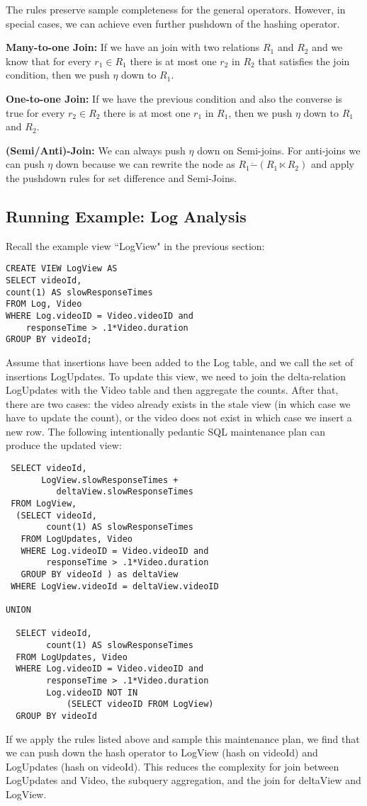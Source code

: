 The rules preserve sample completeness for the general operators. 
However, in special cases, we can achieve even further pushdown of the hashing operator. 

\textbf{Many-to-one Join: } If we have an join with two relations $R_1$ and $R_2$ and we know that for every $r_1 \in R_1$ there is at most one $r_2$ in $R_2$ that satisfies the join condition, then we push $\eta$ down to $R_1$.

\textbf{One-to-one Join: } If we have the previous condition and also the converse is true for every $r_2 \in R_2$ there is at most one $r_1$ in $R_1$, then we push $\eta$ down to $R_1$ and $R_2$.

\textbf{(Semi/Anti)-Join: } We can always push $\eta$ down on Semi-joins. For anti-joins we can push $\eta$ down because we can rewrite the node as $R_1 \dot{-} (R_1 \ltimes R_2) $ and apply the pushdown rules for set difference and Semi-Joins.

\subsection{Running Example: Log Analysis}
Recall the example view ``LogView" in the previous section:
\begin{lstlisting} 
CREATE VIEW LogView AS 
SELECT videoId, 
count(1) AS slowResponseTimes 
FROM Log, Video
WHERE Log.videoID = Video.videoID and
    responseTime > .1*Video.duration
GROUP BY videoId;
\end{lstlisting}

Assume that insertions have been added to the Log table, and we call the set of insertions LogUpdates.
To update this view, we need to join the delta-relation LogUpdates with the Video table and then aggregate the counts.
After that, there are two cases: the video already exists in the stale view (in which case we have to update the count), or
the video does not exist in which case we insert a new row.
The following intentionally pedantic SQL maintenance plan can produce the updated view:
\begin{lstlisting}
 SELECT videoId, 
       LogView.slowResponseTimes + 
          deltaView.slowResponseTimes
 FROM LogView,
  (SELECT videoId, 
        count(1) AS slowResponseTimes 
   FROM LogUpdates, Video
   WHERE Log.videoID = Video.videoID and
        responseTime > .1*Video.duration
   GROUP BY videoId ) as deltaView
 WHERE LogView.videoId = deltaView.videoID

UNION 

  SELECT videoId, 
        count(1) AS slowResponseTimes 
  FROM LogUpdates, Video
  WHERE Log.videoID = Video.videoID and
        responseTime > .1*Video.duration
        Log.videoID NOT IN 
            (SELECT videoID FROM LogView)
  GROUP BY videoId

\end{lstlisting}
If we apply the rules listed above and sample this maintenance plan, we find that we can push down the hash operator to LogView (hash on videoId) and LogUpdates (hash on videoId). 
This reduces the complexity for join between LogUpdates and Video, the subquery aggregation, and the join for deltaView and LogView.
